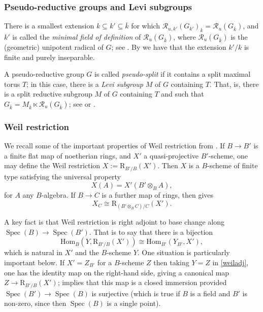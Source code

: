 \documentclass[11pt,reqno]{amsart}
\theoremstyle{definition}
\theoremstyle{remark}
\theoremstyle{definition}
\theoremstyle{plain}
\DeclareMathOperator{\Spec}{Spec}
\newcommand{\R}{\mathrm{R}}
\newcommand{\RR}{\mathscr{R}}
\newcommand{\Hom}{\mathrm{Hom}}
\newcommand{\bark}{{\overline{k}}}
\begin{document}
\subsubsection{Pseudo-reductive groups and Levi subgroups}\label{sec:pseudo-prelims} 
 There is a smallest extension $k\subseteq k'\subseteq \bark$ for which $\RR_{u,k'}(G_{k'})_{\bark}=\RR_u(G_{\bark})$, and $k'$ is called the \emph{minimal field of definition} of $\RR_u(G_{\bark})$, where $\RR_u(G_{\bar{k}})$ is the (geometric) unipotent radical of $G$; see \cite[Def. 1.1.6]{CGP15}. By \cite[Prop.~1.1.9]{CGP15} we have that 
the extension $ k'/k$ is finite and purely inseparable.

A pseudo-reductive group $G$ is called \emph{pseudo-split} if it contains a split maximal torus $T$;
in this case, there is a \emph{Levi subgroup} $M$ of $G$ containing $T$.
That, is, there is a split reductive subgroup $M$ of $G$ containing $T$ and such that $G_{\bar{k}} = M_{\bar{k}} \ltimes \RR_u(G_{\bar{k}})$; see \cite[Thm. 3.4.6]{CGP15} or \cite[Thm. 5.4.4]{CPSurv}.




\subsubsection{Weil restriction}\label{sec:Weil} 
We recall some of the important properties of Weil restriction from \cite[\S A.5]{CGP15}.	 
If $B\to B'$ is a finite flat map of noetherian rings, and $X'$ a quasi-projective $B'$-scheme, one may define the Weil restriction 
$X:=\R_{B'/B}(X')$. Then $X$ is a $B$-scheme of finite type satisfying the universal property
\[X(A)=X'(B'\otimes_B A),\]
for $A$ any $B$-algebra. If $B\to C$ is a further map of rings, then \cite[A.2.7]{Oes84} gives 
\begin{equation}\label{eq:weilandback}X_C\cong \R_{(B'\otimes_B C)/C}(X').\end{equation}

A key fact is that Weil restriction is right adjoint to base change along $\Spec(B)\to \Spec(B')$. That is to say that there is a bijection
\begin{equation}\label{weiladj}\Hom_B(Y,\R_{B'/B}(X'))\cong \Hom_{B'}(Y_{B'},X'),\end{equation}
which is natural in $X'$ and the $B$-scheme $Y$. 
One situation is particularly important below. 
If $X'=Z_{B'}$ for a $B$-scheme $Z$ then taking $Y=Z$ in \cref{weiladj}, one has the identity map on the right-hand side, giving a canonical map $Z\to \R_{B'/B}(X')$; \cite[A.5.7]{CGP15} implies that this map is a closed immersion provided $\Spec(B')\to \Spec(B)$ is surjective (which is true if $B$ is a field and $B'$ is non-zero, since then $\Spec(B)$ is a single point). 
\end{document}
